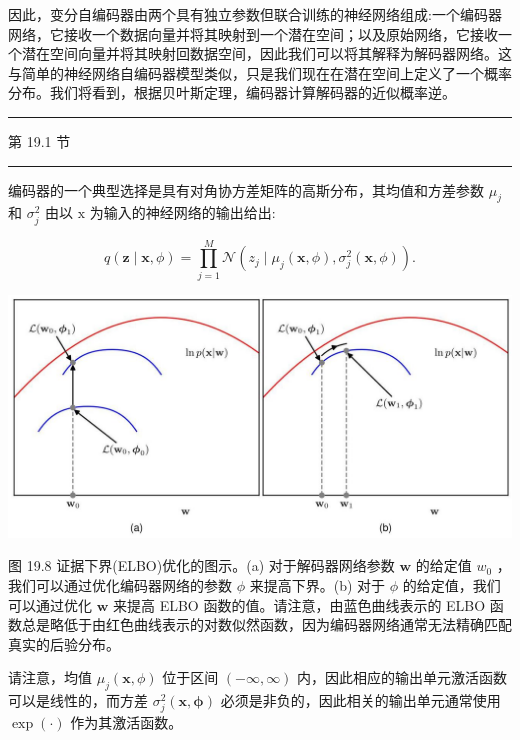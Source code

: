\documentclass[10pt]{report}
\newcommand{\HRule}{\begin{center}\rule{0.9\linewidth}{0.2mm}\end{center}}
\begin{document}
因此，变分自编码器由两个具有独立参数但联合训练的神经网络组成:一个编码器网络，它接收一个数据向量并将其映射到一个潜在空间；以及原始网络，它接收一个潜在空间向量并将其映射回数据空间，因此我们可以将其解释为解码器网络。这与简单的神经网络自编码器模型类似，只是我们现在在潜在空间上定义了一个概率分布。我们将看到，根据贝叶斯定理，编码器计算解码器的近似概率逆。

\HRule

第 19.1 节

\HRule

编码器的一个典型选择是具有对角协方差矩阵的高斯分布，其均值和方差参数 \({\mu }_{j}\) 和 \({\sigma }_{j}^{2}\) 由以 \(\mathrm{x}\) 为输入的神经网络的输出给出:

\[
q\left( {\mathbf{z} \mid  \mathbf{x},\phi }\right)  = \mathop{\prod }\limits_{{j = 1}}^{M}\mathcal{N}\left( {{z}_{j} \mid  {\mu }_{j}\left( {\mathbf{x},\phi }\right) ,{\sigma }_{j}^{2}\left( {\mathbf{x},\phi }\right) }\right) . \tag{19.13}
\]

\begin{center}
\includegraphics[max width=1.0\textwidth]{images/0194e279-9b28-703a-88f4-c3ac21e2010d_592_239_347_1324_640_0.jpg}
\end{center}
\hspace*{3em} 

图 19.8 证据下界(ELBO)优化的图示。(a) 对于解码器网络参数 \(\mathbf{w}\) 的给定值 \({w}_{0}\) ，我们可以通过优化编码器网络的参数 \(\phi\) 来提高下界。(b) 对于 \(\phi\) 的给定值，我们可以通过优化 \(\mathbf{w}\) 来提高 ELBO 函数的值。请注意，由蓝色曲线表示的 ELBO 函数总是略低于由红色曲线表示的对数似然函数，因为编码器网络通常无法精确匹配真实的后验分布。

请注意，均值 \({\mu }_{j}\left( {\mathbf{x},\phi }\right)\) 位于区间 \(\left( {-\infty ,\infty }\right)\) 内，因此相应的输出单元激活函数可以是线性的，而方差 \({\sigma }_{j}^{2}\left( {\mathbf{x},\mathbf{\phi }}\right)\) 必须是非负的，因此相关的输出单元通常使用 \(\exp \left( \cdot \right)\) 作为其激活函数。
\end{document}
